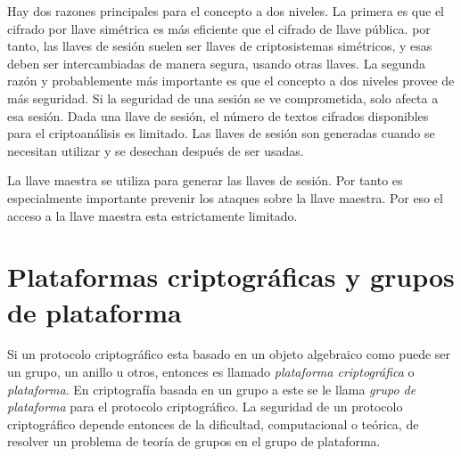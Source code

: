 \documentclass[12pt]{book}
\theoremstyle{definition}
\begin{document}
Hay dos razones principales para el concepto a dos niveles. La primera es que el cifrado por llave simétrica es más eficiente que el cifrado de llave pública. por tanto, las llaves de sesión suelen ser llaves de criptosistemas simétricos, y esas deben ser intercambiadas de manera segura, usando otras llaves. La segunda razón y probablemente más importante es que el concepto a dos niveles provee de más seguridad. Si la seguridad de una sesión se ve comprometida, solo afecta a esa sesión. Dada una llave de sesión, el número de textos cifrados disponibles para el criptoanálisis es limitado. Las llaves de sesión son generadas cuando se necesitan utilizar y se desechan después de ser usadas.

La llave maestra se utiliza para generar las llaves de sesión. Por tanto es especialmente importante prevenir los ataques sobre la llave maestra. Por eso el acceso a la llave maestra esta estrictamente limitado.





















\section{Plataformas criptográficas y grupos de plataforma}

Si un protocolo criptográfico esta basado en un objeto algebraico como puede ser un grupo, un anillo u otros, entonces es llamado \textit{plataforma criptográfica} o \textit{plataforma}. En criptografía basada en un grupo a este se le llama \textit{grupo de plataforma} para el protocolo criptográfico. La seguridad de un protocolo criptográfico depende entonces de la dificultad, computacional o teórica, de resolver un problema de teoría de grupos en el grupo de plataforma.
\end{document}
